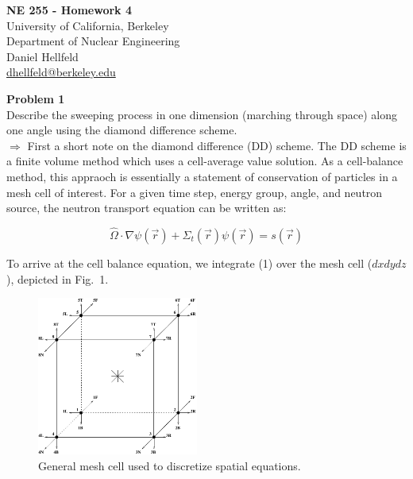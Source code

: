 \documentclass[10pt]{article}
\begin{document}
\begin{centering}
\textbf{\large NE 255 - Homework 4}\\
\vspace{10pt}
University of California, Berkeley\\
Department of Nuclear Engineering\\
\vspace{10pt}
Daniel Hellfeld\\
\href{mailto:dhellfeld@berkeley.edu}{dhellfeld@berkeley.edu}\\
\end{centering}




\vspace{20pt}
\noindent \textbf{Problem 1}\\
Describe the sweeping process in one dimension (marching through space) along one angle using the diamond difference scheme.\\

$\Rightarrow$ First a short note on the diamond difference (DD) scheme. The DD scheme is a finite volume method which uses a cell-average value solution. As a cell-balance method, this appraoch is essentially a statement of conservation of particles in a mesh cell of interest. For a given time step, energy group, angle, and neutron source, the neutron transport equation can be written as:

\begin{equation}
        \hat{\Omega} \cdot \nabla \psi(\vec{r}) + \Sigma_t(\vec{r})\psi(\vec{r}) = s(\vec{r})
\end{equation}

To arrive at the cell balance equation, we integrate (1) over the mesh cell ($dxdydz$), depicted in Fig.~1.

\begin{figure}[htb]
    \centering
    \includegraphics[width=150pt]{Figures/mesh_cell_sn}
    \caption{General mesh cell used to discretize spatial equations.}
    \label{cellmesh}
\end{figure}
\end{document}

